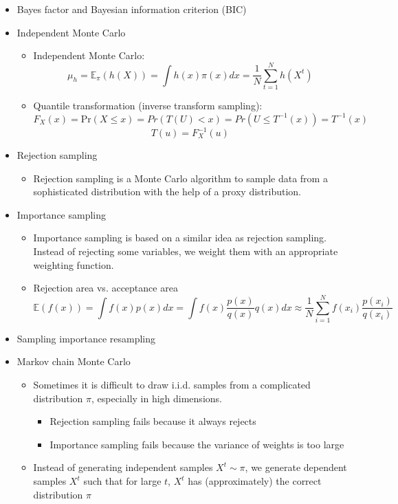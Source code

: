 \documentclass[a4paper]{article}
\begin{document}
\begin{itemize}
    \item Bayes factor and Bayesian information criterion (BIC)
    \item Independent Monte Carlo
    \begin{itemize}
        \item Independent Monte Carlo:
        \[\mu_h=\mathbb{E}_{\pi}(h(X))=\int h(x)\pi(x)dx=\frac{1}{N}\sum_{t=1}^{N}h(X^t) \]
        \item Quantile transformation (inverse transform sampling):
        \[F_X(x)=\text{Pr}(X\leq x)=Pr(T(U)<x)=Pr(U\leq T^{-1}(x))=T^{-1}(x) \]
        \[T(u)=F_X^{-1}(u) \]
    \end{itemize}
    \item Rejection sampling
    \begin{itemize}
        \item Rejection sampling is a Monte Carlo algorithm to sample data from a sophisticated distribution with the help of a proxy distribution.
    \end{itemize}
    \item Importance sampling
    \begin{itemize}
        \item Importance sampling is based on a similar idea as rejection sampling. Instead of rejecting some variables, we weight them with an appropriate weighting function.
        \item Rejection area vs. acceptance area
        \[\mathbb{E}(f(x))=\int f(x)p(x)dx=\int f(x)\frac{p(x)}{q(x)}q(x)dx\approx\frac{1}{N}\sum_{i=1}^{N}f(x_i)\frac{p(x_i)}{q(x_i)} \]
    \end{itemize}
    \item Sampling importance resampling
    \item Markov chain Monte Carlo
    \begin{itemize}
        \item Sometimes it is difficult to draw i.i.d. samples from a complicated distribution $\pi$, especially in high dimensions.
        \begin{itemize}
            \item Rejection sampling fails because it always rejects
            \item Importance sampling fails because the variance of weights is too large
        \end{itemize}
        \item Instead of generating independent samples $X^t\sim\pi$, we generate dependent samples $X^t$ such that for large $t$, $X^t$ has (approximately) the correct distribution $\pi$

\end{itemize}
\end{itemize}
\end{document}
